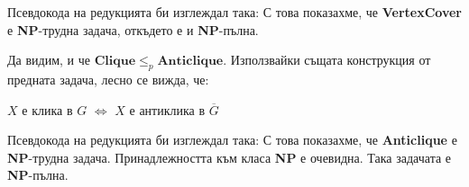 \documentclass{article}
\newcommand{\NP}{\textbf{NP}}
\theoremstyle{definition}
\theoremstyle{plain}
\theoremstyle{remark}
\theoremstyle{definition}
\begin{document}
Псевдокода на редукцията би изглеждал така:
С това показахме, че \textbf{VertexCover} е \NP-трудна задача, откъдето е и \NP-пълна.

\pagebreak

Да видим, и че $\mathbf{Clique} \leq_p \mathbf{Anticlique}$.
Използвайки същата конструкция от предната задача, лесно се вижда, че:
\begin{center}
    $X$ е клика в $G$ $\iff$ $X$ е антиклика в $\overline{G}$
\end{center}
Псевдокода на редукцията би изглеждал така:
С това показахме, че \textbf{Anticlique} е \NP-трудна задача.
Принадлежността към класа \NP{ } е очевидна.
Така задачата е \NP-пълна.
\end{document}
